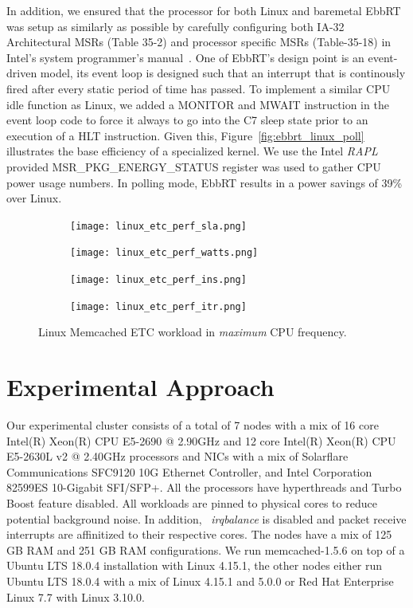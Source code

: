 \documentclass[letterpaper,twocolumn,10pt]{article}
\begin{document}
In addition, we ensured that the processor for both Linux and baremetal EbbRT was setup as similarly as possible by carefully configuring both IA-32 Architectural MSRs (Table 35-2) and processor specific MSRs (Table-35-18) in Intel's system programmer's manual~\cite{intel_msr}. One of EbbRT's design point is an event-driven model, its event loop is designed such that an interrupt that is continously fired after every static period of time has passed. To implement a similar CPU idle function as Linux, we added a MONITOR and MWAIT instruction in the event loop code to force it always to go into the C7 sleep state prior to an execution of a HLT instruction. Given this, Figure~\ref{fig:ebbrt_linux_poll} illustrates the base efficiency of a specialized kernel. We use the Intel \textit{RAPL} provided MSR\_PKG\_ENERGY\_STATUS register was used to gather CPU power usage numbers. In polling mode, EbbRT results in a power savings of 39\% over Linux.
\begin{figure}
 \begin{subfigure}{0.5\textwidth}
   \texttt{[image: linux\_etc\_perf\_sla.png]}
   \caption{}
   \label{fig:linux_etc_perf:sla}
 \end{subfigure}
  \begin{subfigure}{0.5\textwidth}
   \texttt{[image: linux\_etc\_perf\_watts.png]}
   \caption{}
   \label{fig:linux_etc_perf:watts}
  \end{subfigure}
  \begin{subfigure}{0.5\textwidth}
   \texttt{[image: linux\_etc\_perf\_ins.png]}
   \caption{}
   \label{fig:linux_etc_perf:ins}
  \end{subfigure}
  \begin{subfigure}{0.5\textwidth}
   \texttt{[image: linux\_etc\_perf\_itr.png]}
   \caption{}
   \label{fig:linux_etc_perf:itr}
  \end{subfigure}
  \caption{Linux Memcached ETC workload in \textit{maximum} CPU frequency.}
  \label{fig:linux_etc_perf:main}
\end{figure}

\section{Experimental Approach}
\label{sec:exp_app}
Our experimental cluster consists of a total of 7 nodes with a mix of 16 core Intel(R) Xeon(R) CPU E5-2690 @ 2.90GHz and 12 core Intel(R) Xeon(R) CPU E5-2630L v2 @ 2.40GHz processors and NICs with a mix of Solarflare Communications SFC9120 10G Ethernet Controller, and Intel Corporation 82599ES 10-Gigabit SFI/SFP+. All the processors have hyperthreads and Turbo Boost feature disabled. All workloads are pinned to physical cores to reduce potential background noise. In addition, ~\textit{irqbalance} is disabled and packet receive interrupts are affinitized to their respective cores. The nodes have a mix of 125 GB RAM and 251 GB RAM configurations. We run memcached-1.5.6 on top of a Ubuntu LTS 18.0.4 installation with Linux 4.15.1, the other nodes either run Ubuntu LTS 18.0.4 with a mix of Linux 4.15.1 and 5.0.0 or Red Hat Enterprise Linux 7.7 with Linux 3.10.0.
\end{document}

